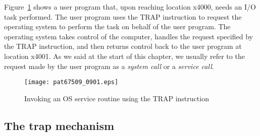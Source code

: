 \documentclass{patt}
\begin{document}
Figure~\ref{fig:os_call} shows a user program that, upon reaching
location x4000, needs an I/O task performed.  The user program uses the 
TRAP instruction to
request the operating system to perform the task on behalf of the
user program.  The operating system takes control of the computer,
handles the request specified by the TRAP instruction, and then
returns control back to the user program at location x4001.  As we said
at the start of this chapter, we usually
refer to the request made by the user program as a {\em system call}
or a {\em service call}.

\begin{figure}[h!]
\centerline{\texttt{[image: pat67509\_0901.eps]}}
\caption{Invoking an OS service routine using the TRAP instruction}
\label{fig:os_call}
\end{figure}

\FloatBarrier
\subsection{The trap mechanism}
\end{document}

